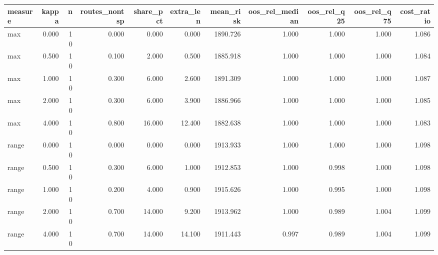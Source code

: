 \begin{tabular}{lrrrrrrrrrr}
\toprule
measure & kappa & n & routes\_nontsp & share\_pct & extra\_len & mean\_risk & oos\_rel\_median & oos\_rel\_q25 & oos\_rel\_q75 & cost\_ratio \\
\midrule
max & 0.000 & 10 & 0.000 & 0.000 & 0.000 & 1890.726 & 1.000 & 1.000 & 1.000 & 1.086 \\
max & 0.500 & 10 & 0.100 & 2.000 & 0.500 & 1885.918 & 1.000 & 1.000 & 1.000 & 1.084 \\
max & 1.000 & 10 & 0.300 & 6.000 & 2.600 & 1891.309 & 1.000 & 1.000 & 1.000 & 1.087 \\
max & 2.000 & 10 & 0.300 & 6.000 & 3.900 & 1886.966 & 1.000 & 1.000 & 1.000 & 1.085 \\
max & 4.000 & 10 & 0.800 & 16.000 & 12.400 & 1882.638 & 1.000 & 1.000 & 1.000 & 1.083 \\
range & 0.000 & 10 & 0.000 & 0.000 & 0.000 & 1913.933 & 1.000 & 1.000 & 1.000 & 1.098 \\
range & 0.500 & 10 & 0.300 & 6.000 & 1.000 & 1912.853 & 1.000 & 0.998 & 1.000 & 1.098 \\
range & 1.000 & 10 & 0.200 & 4.000 & 0.900 & 1915.626 & 1.000 & 0.995 & 1.000 & 1.098 \\
range & 2.000 & 10 & 0.700 & 14.000 & 9.200 & 1913.962 & 1.000 & 0.989 & 1.004 & 1.099 \\
range & 4.000 & 10 & 0.700 & 14.000 & 14.100 & 1911.443 & 0.997 & 0.989 & 1.004 & 1.099 \\
\bottomrule
\end{tabular}

